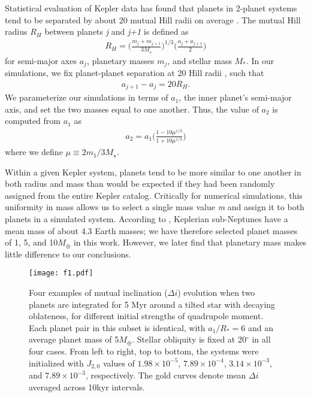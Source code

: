 \documentclass[twocolumn]{aastex63}
\begin{document}
Statistical evaluation of Kepler data has found that planets in 2-planet systems tend to be separated by about 20 mutual Hill radii on average \citep{weiss2018california}. The mutual Hill radius \(R_H\) between planets \textit{j} and\textit{ j+1} is defined as \citep{1993Icar..106..247G}
\begin{align}\label{hill}
 R_H=\bigg(\frac{m_j+m_{j+1}}{3M_\star}\bigg)^{1/3}\bigg(\frac{a_j+a_{j+1}}{2} \bigg)
\end{align}
for semi-major axes $a_j$, planetary masses $m_j$, and stellar mass \(M_*\). In our simulations, we fix planet-planet separation at 20 Hill radii \citep{weiss2018california}, such that
\begin{align}
  a_{j+1}-a_j=20R_H.
\end{align}
We parameterize our simulations in terms of $a_1$, the inner planet's semi-major axis, and set the two masses equal to one another. Thus, the value of $a_2$ is computed from $a_1$ as  
\begin{align}
a_2=a_1\bigg(\frac{1-10\mu^{1/3}}{1+10\mu^{1/3}}\bigg)
\end{align}
where we define $\mu\equiv 2m_1/3M_\star$. 

Within a given Kepler system, planets tend to be more similar to one another in both radius \citep{weiss2018california} and mass \citep{millholland2017kepler} than would be expected if they had been randomly assigned from the entire Kepler catalog. Critically for numerical simulations, this uniformity in mass allows us to select a single mass value \textit{m} and assign it to both planets in a simulated system. According to \cite{2014ApJ...783L...6W}, Keplerian sub-Neptunes have a mean mass of about 4.3 Earth masses; we have therefore selected planet masses of 1, 5, and 10\(M_\oplus\) in this work. However, we later find that planetary mass makes little difference to our conclusions. 

\begin{figure}
\centering
\texttt{[image: f1.pdf]}
\caption{Four examples of mutual inclination (\(\Delta i\)) evolution when two planets are integrated for 5 Myr around a tilted star with decaying oblateness, for different initial strengths of quadrupole moment. Each planet pair in this subset is identical, with \(a_1/R_*= 6\) and an average planet mass of 5\(M_\oplus\). Stellar obliquity is fixed at 20$^{\circ}$ in all four cases. From left to right, top to bottom, the systems were initialized with \(J_{2,0} \) values of \(1.98\times10^{-5}\), \(7.89\times10^{-4}\), \(3.14\times10^{-3}\), and \(7.89\times10^{-3}\), respectively. The gold curves denote mean \(\Delta i\) averaged across 10kyr intervals.}\label{4panel}
\end{figure}
\end{document}
